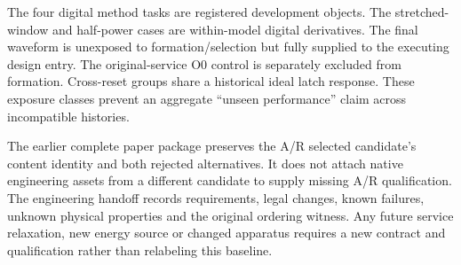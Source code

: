 The four digital method tasks are registered development objects. The
stretched-window and half-power cases are within-model digital derivatives.
The final waveform is unexposed to formation/selection but fully supplied to
the executing design entry. The original-service O0 control is separately
excluded from formation. Cross-reset groups share a historical ideal latch
response. These exposure classes prevent an aggregate ``unseen performance''
claim across incompatible histories.

The earlier complete paper package preserves the A/R selected candidate's content
identity and both rejected alternatives. It does not attach native engineering
assets from a different candidate to supply missing A/R qualification. The
engineering handoff records requirements, legal changes, known failures,
unknown physical properties and the original ordering witness. Any future
service relaxation, new energy source or changed apparatus requires a new
contract and qualification rather than relabeling this baseline.
